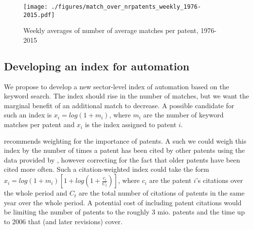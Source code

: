 \documentclass[11pt,a4paper]{article}
\begin{document}
\begin{figure}[tb]
\caption{Weekly averages of number of average matches per patent, 1976-2015}
	\centering
	\texttt{[image: ./figures/match\_over\_nrpatents\_weekly\_1976-2015.pdf]}
	\label{fig:match_per_nrpatents}
\end{figure}



\subsection{Developing an index for automation}
We propose to develop a new sector-level index of automation based on the keyword search. The index should rise in the number of matches, but we want the marginal benefit of an additional match to decrease.  A possible candidate for such an index is $x_i = log(1+m_i)$, where $m_i$ are the number of keyword matches per patent and $x_i$ is the index assigned to patent $i$. 

\cite{G1998} recommends weighting for the importance of patents. A such we could weigh this index by the number of times a patent has been cited by other patents using the data provided by \cite{HJT2001}, however correcting for the fact that older patents have been cited more often. Such a citation-weighted index could take the form $x_i = log(1+m_i) [1+log(1+\frac{c_i}{C_t})]$, where $c_i$ are the patent $i$'s citations over the whole period and $C_t$ are the total number of citations of patents in the same year over the whole period. A potential cost of including patent citations would be limiting the number of patents to the roughly 3 mio. patents and the time up to 2006 that \cite{HJT2001} (and later revisions) cover. 
\end{document}
